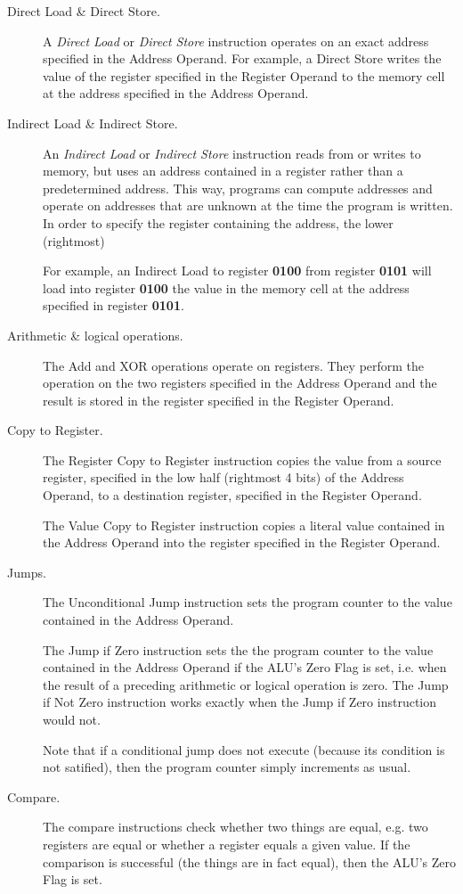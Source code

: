 \documentclass[11pt]{article}
\newcommand{\regname}{\textbf}
\begin{document}
\begin{description}
\item[Direct Load \& Direct Store.]
  A \emph{Direct Load} or \emph{Direct Store} instruction operates on an exact address
  specified in the Address Operand.
  For example, a Direct Store writes the value of the register specified in the
  Register Operand to the memory cell at the address specified in the Address
  Operand.

\item[Indirect Load \& Indirect Store.]
  An \emph{Indirect Load} or \emph{Indirect Store} instruction reads from or
  writes to memory, but uses an address contained in a register rather than a
  predetermined address.
  This way, programs can compute addresses and operate on addresses that are
  unknown at the time the program is written.
  In order to specify the register containing the address, the lower (rightmost)

  For example, an Indirect Load to register \regname{0100} from register
  \regname{0101} will load into register \regname{0100} the value in the memory
  cell at the address specified in register \regname{0101}.

\item[Arithmetic \& logical operations.]
  The Add and XOR operations operate on registers. They perform the operation on
  the two registers specified in the Address Operand and the result is stored in
  the register specified in the Register Operand.

\item[Copy to Register.]
  The Register Copy to Register instruction copies the value from a source
  register, specified in the low half (rightmost 4 bits) of the Address Operand,
  to a destination register, specified in the Register Operand.

  The Value Copy to Register instruction copies a literal value contained in the
  Address Operand into the register specified in the Register Operand.

\item[Jumps.]
  The Unconditional Jump instruction sets the program counter to the value
  contained in the Address Operand.

  The Jump if Zero instruction sets the the program counter to the value
  contained in the Address Operand if the ALU's Zero Flag is set, i.e. when the
  result of a preceding arithmetic or logical operation is zero.
  The Jump if Not Zero instruction works exactly when the Jump if Zero
  instruction would not.

  Note that if a conditional jump does not execute (because its condition is not
  satified), then the program counter simply increments as usual.

\item[Compare.]
  The compare instructions check whether two things are equal, e.g.  two
  registers are equal or whether a register equals a given value.
  If the comparison is successful (the things are in fact equal), then the ALU's
  Zero Flag is set.
\end{description}
\end{document}
